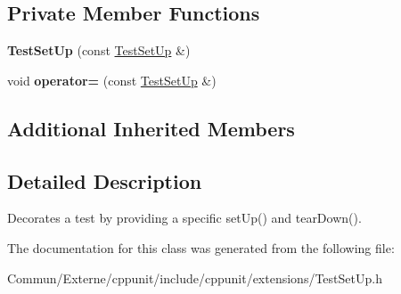 \subsection*{Private Member Functions}
\begin{DoxyCompactItemize}
\item 
{\bfseries Test\+Set\+Up} (const \hyperlink{class_test_set_up}{Test\+Set\+Up} \&)\hypertarget{class_test_set_up_a91866b3dfa08c7d174efbd66124e5bdd}{}\label{class_test_set_up_a91866b3dfa08c7d174efbd66124e5bdd}

\item 
void {\bfseries operator=} (const \hyperlink{class_test_set_up}{Test\+Set\+Up} \&)\hypertarget{class_test_set_up_ae1d7a594079aa772c3ba6e90162a73e1}{}\label{class_test_set_up_ae1d7a594079aa772c3ba6e90162a73e1}

\end{DoxyCompactItemize}
\subsection*{Additional Inherited Members}


\subsection{Detailed Description}
Decorates a test by providing a specific set\+Up() and tear\+Down(). 

The documentation for this class was generated from the following file\+:\begin{DoxyCompactItemize}
\item 
Commun/\+Externe/cppunit/include/cppunit/extensions/Test\+Set\+Up.\+h\end{DoxyCompactItemize}
